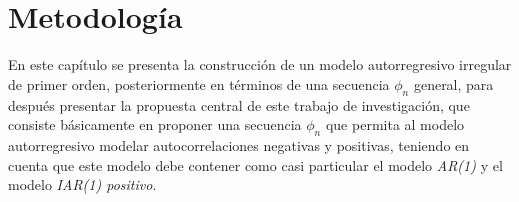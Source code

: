 \chapter{Metodología}

En este capítulo se presenta la construcción de un modelo autorregresivo irregular de primer orden, 
posteriormente en términos de una secuencia $\phi_{n}$ general, para después presentar la propuesta central
de este trabajo de investigación, que consiste básicamente en proponer una secuencia $\phi_{n}$ que permita
al modelo autorregresivo modelar autocorrelaciones negativas y positivas, teniendo en cuenta que este modelo
debe contener como casi particular el modelo \emph{AR(1)} y el modelo \emph{IAR(1) positivo}.

